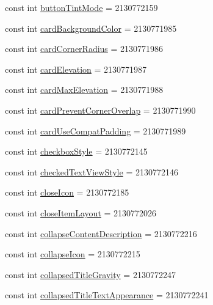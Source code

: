 \begin{CompactItemize}
const int \hyperlink{class__2doo_1_1_droid_1_1_resource_1_1_attribute_5ecddddeb4fbfcbdee7651d1eca6b74f}{buttonTintMode} = 2130772159
\item 
const int \hyperlink{class__2doo_1_1_droid_1_1_resource_1_1_attribute_22434689a4c2868d7b0f1cec9d20e86f}{cardBackgroundColor} = 2130771985
\item 
const int \hyperlink{class__2doo_1_1_droid_1_1_resource_1_1_attribute_cfc8dcd3d82e2841e29687308a6e501f}{cardCornerRadius} = 2130771986
\item 
const int \hyperlink{class__2doo_1_1_droid_1_1_resource_1_1_attribute_954025fc7e63b9e2148f3e5ab7205f97}{cardElevation} = 2130771987
\item 
const int \hyperlink{class__2doo_1_1_droid_1_1_resource_1_1_attribute_0650d28fda981115871d6b736c34d23e}{cardMaxElevation} = 2130771988
\item 
const int \hyperlink{class__2doo_1_1_droid_1_1_resource_1_1_attribute_fd9af77cecb192a2132f120e86b576b0}{cardPreventCornerOverlap} = 2130771990
\item 
const int \hyperlink{class__2doo_1_1_droid_1_1_resource_1_1_attribute_19bdf202ea5570c65e6b3dbd0cb14856}{cardUseCompatPadding} = 2130771989
\item 
const int \hyperlink{class__2doo_1_1_droid_1_1_resource_1_1_attribute_dcf1f1f1936eb18a79c5e86b82bc2c94}{checkboxStyle} = 2130772145
\item 
const int \hyperlink{class__2doo_1_1_droid_1_1_resource_1_1_attribute_9e3ebbadebc1b437156766a8997f36e9}{checkedTextViewStyle} = 2130772146
\item 
const int \hyperlink{class__2doo_1_1_droid_1_1_resource_1_1_attribute_3e6a94da0f36b7b3902f261554190e4b}{closeIcon} = 2130772185
\item 
const int \hyperlink{class__2doo_1_1_droid_1_1_resource_1_1_attribute_a0ea00be9afe13cf574cf2085407c2cc}{closeItemLayout} = 2130772026
\item 
const int \hyperlink{class__2doo_1_1_droid_1_1_resource_1_1_attribute_f2b22ac1537fea4441a5fbc9c004952b}{collapseContentDescription} = 2130772216
\item 
const int \hyperlink{class__2doo_1_1_droid_1_1_resource_1_1_attribute_b43bb89f82ff082dc5915a32815ab29a}{collapseIcon} = 2130772215
\item 
const int \hyperlink{class__2doo_1_1_droid_1_1_resource_1_1_attribute_db8dcb9a0e5907a469db46fc2525fdf8}{collapsedTitleGravity} = 2130772247
\item 
const int \hyperlink{class__2doo_1_1_droid_1_1_resource_1_1_attribute_be67442a51891af34375b65aa1a90592}{collapsedTitleTextAppearance} = 2130772241

\end{CompactItemize}
